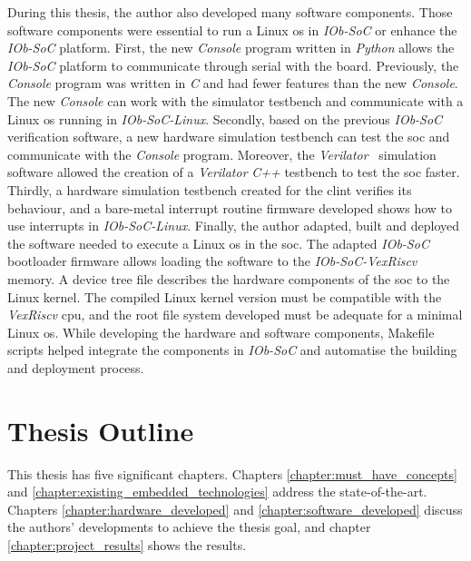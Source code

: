 During this thesis, the author also developed many software components. Those software components were essential to run a Linux \acrshort{os} in \textit{IOb-SoC} or enhance the \textit{IOb-SoC} platform. First, the new \textit{Console} program written in \textit{Python} allows the \textit{IOb-SoC} platform to communicate through serial with the board. Previously, the \textit{Console} program was written in \textit{C} and had fewer features than the new \textit{Console}. The new \textit{Console} can work with the simulator testbench and communicate with a Linux \acrshort{os} running in \textit{IOb-SoC-Linux}. Secondly, based on the previous \textit{IOb-SoC} verification software, a new hardware simulation testbench can test the \acrshort{soc} and communicate with the \textit{Console} program. Moreover, the \textit{Verilator}~\cite{snyder2010verilator} simulation software allowed the creation of a \textit{Verilator} \textit{C++} testbench to test the \acrshort{soc} faster. Thirdly, a hardware simulation testbench created for the \acrshort{clint} verifies its behaviour, and a bare-metal interrupt routine firmware developed shows how to use interrupts in \textit{IOb-SoC-Linux}. Finally, the author adapted, built and deployed the software needed to execute a Linux \acrshort{os} in the \acrshort{soc}. The adapted \textit{IOb-SoC} bootloader firmware allows loading the software to the \textit{IOb-SoC-VexRiscv} memory. A device tree file describes the hardware components of the \acrshort{soc} to the Linux kernel. The compiled Linux kernel version must be compatible with the \textit{VexRiscv} \acrshort{cpu}, and the root file system developed must be adequate for a minimal Linux \acrshort{os}. While developing the hardware and software components, Makefile scripts helped integrate the components in \textit{IOb-SoC} and automatise the building and deployment process.

\section{Thesis Outline}
\label{section:thesis_outline}
This thesis has five significant chapters. Chapters \ref{chapter:must_have_concepts} and \ref{chapter:existing_embedded_technologies} address the state-of-the-art. Chapters \ref{chapter:hardware_developed} and \ref{chapter:software_developed} discuss the authors' developments to achieve the thesis goal, and chapter \ref{chapter:project_results} shows the results. 


